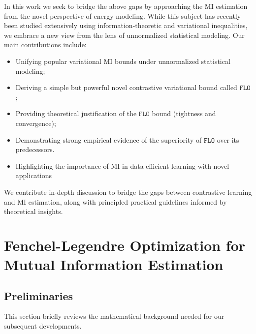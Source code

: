 \documentclass{article}
\theoremstyle{plain}
\theoremstyle{definition}
\theoremstyle{remark}
\newcommand{\FLO}{\texttt{FLO}}
\begin{document}
	In this work we seek to bridge the above gaps by approaching the MI estimation from the novel perspective of energy modeling. While this subject has recently been studied extensively using information-theoretic and variational inequalities, we embrace a new view from the lens of unnormalized statistical modeling. Our main contributions include: 
	\begin{itemize}
		\vspace{-5pt}
		\item Unifying popular variational MI bounds under unnormalized statistical modeling; 
		\item Deriving a simple but powerful novel contrastive variational bound called $\FLO$; 
		\item Providing theoretical justification of the $\FLO$ bound (tightness and convergence);
		\item Demonstrating strong empirical evidence of the superiority of $\FLO$ over its predecessors.
		\item Highlighting the importance of MI in data-efficient learning with novel applications 
		\vspace{-5pt}
	\end{itemize} 
	We contribute in-depth discussion to bridge the gaps between contrastive learning and MI estimation, along with principled practical guidelines informed by theoretical insights. 
	
	
	\vspace{-8pt}
	\section{Fenchel-Legendre Optimization for Mutual Information Estimation}
	\label{sec:flo}
	\vspace{-5pt}
	
	\subsection{Preliminaries}
	\vspace{-4pt}
	
	This section briefly reviews the mathematical background needed for our subsequent developments. 
	
\end{document}
